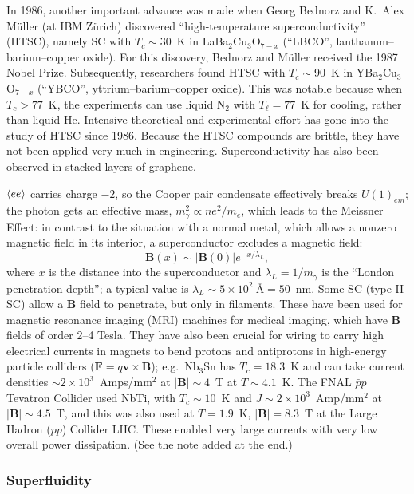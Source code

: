 In 1986, another important advance was made when Georg Bednorz and K.~Alex M\"uller (at IBM Z\"urich) discovered
``high-temperature superconductivity'' (HTSC), namely SC with $T_c\sim 30$~K in LaBa$_2$Cu$_3$O$_{7-x}$ (``LBCO'',
lanthanum--barium--copper oxide). For this discovery, Bednorz and M\"uller received the 1987 Nobel Prize. Subsequently,
researchers found HTSC with $T_c\sim 90$~K in YBa$_2$Cu$_3$O$_{7-x}$ (``YBCO'', yttrium--barium--copper oxide). This was notable
because when $T_c>77$~K, the experiments can use liquid N$_2$ with $T_\ell = 77$~K for cooling, rather than liquid He. Intensive
theoretical and experimental effort has gone into the study of HTSC since 1986. Because the HTSC compounds are brittle, they
have not been applied very much in engineering. Superconductivity has also been observed in stacked layers of graphene.

$\langle ee\rangle$ carries charge $-2$, so the Cooper pair condensate effectively breaks $U(1)_{em}$; the photon gets an effective mass,
$m_\gamma^2\propto ne^2/m_e$, which leads to the Meissner Effect: in contrast to the situation with a normal metal,
which allows a nonzero magnetic field in its interior, a superconductor excludes a magnetic field:
\begin{equation}
  \mathbf B(x)\sim|\mathbf B(0)|e^{-x/\lambda_L},
\end{equation}
where $x$ is the distance into the superconductor and $\lambda_L = 1/m_\gamma$ is the ``London penetration depth''; a
typical value is $\lambda_L\sim 5\times 10^2\ \text{\AA} = 50$~nm. Some SC (type II SC) allow a $\mathbf B$ field to penetrate,
but only in filaments. These have been used for magnetic resonance imaging (MRI) machines for medical imaging, which have
$\mathbf B$ fields of order 2--4 Tesla. They have also been crucial for wiring to carry high electrical currents in magnets to
bend protons and antiprotons in high-energy particle colliders ($\mathbf F = q\mathbf v\times\mathbf B$); e.g.\ Nb$_3$Sn has
$T_c = 18.3$~K and can take current densities $\sim 2\times 10^3$~Amps/mm$^2$ at $|\mathbf B|\sim 4$~T at $T\sim 4.1$~K. The
FNAL $\bar pp$ Tevatron Collider used NbTi, with $T_c\sim 10$~K and $J\sim 2\times 10^3$~Amp/mm$^2$ at $|\mathbf B|\sim 4.5$~T,
and this was also used at $T = 1.9$~K, $|\mathbf B| = 8.3$~T at the Large Hadron ($pp$) Collider LHC. These enabled very large
currents with very low overall power dissipation. (See the note added at the end.)

\subsubsection*{Superfluidity}

